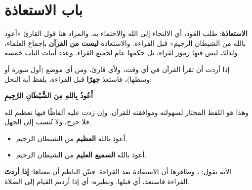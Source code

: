 \chapter{باب الاستعاذة}

\textbf{الاستعاذة}: طلب العَوذ، أي الالتجاء إلى الله والاحتماء به. والمراد هنا قول القارئ «أعوذ بالله من الشيطان الرجيم» قبل القراءة.
والاستعاذة \textbf{ليست من القرآن} بإجماع العلماء، ولذلك ليس فيها رموز لقراء، بل حكمها عام لجميع القراء. وعدد أبيات الباب خمسة.

\begin{mufradat}
\end{mufradat}

\maana[(البيتان ٩٥–٩٦)]
إذا أردت أن تقرأ القرآن في أي وقت، ولأي قارئ، ومن أي موضع (أول سورة أو وسطها)، فاستعذ \textbf{جهرًا} قبل القراءة، بلفظ آية النحل:
\begin{center}
\textbf{\large أَعُوذُ بِاللهِ مِنَ الشَّيْطَانِ الرَّجِيمِ}
\end{center}
وهذا هو اللفظ المختار لسهولته وموافقته للقرآن. وإن زدت عليه ألفاظًا فيها تعظيم لله فلا حرج، ولا تُنسب إلى الجهل.

\begin{amthila}
\begin{itemize}
\item أعوذ بالله \textbf{العظيم} من الشيطان الرجيم.
\item أعوذ بالله \textbf{السميع العليم} من الشيطان الرجيم.
\end{itemize}
\end{amthila}

\begin{qaida}
الآية تقول: ، وظاهرها أن الاستعاذة بعد القراءة. فبيّن الناظم أن معناها: \textbf{إذا أردتَ} القراءة فاستعذ، أي قبلها. ونظيره:   أي إذا أردتم القيام إلى الصلاة.
\end{qaida}

